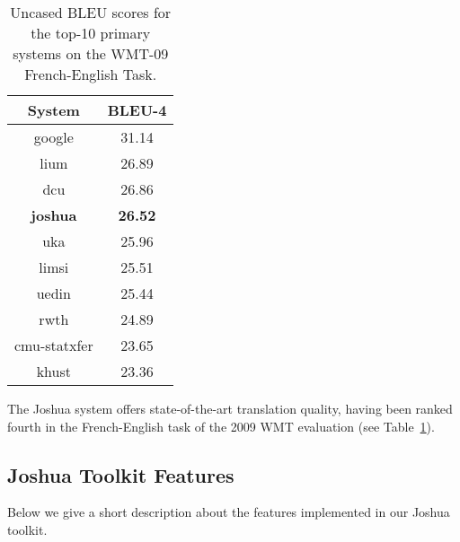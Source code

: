 \documentclass[11pt]{article}
\begin{document}
\newpage

\begin{table}[t]
\begin{center}
\begin{tabular}{c c}\hline
  System & BLEU-4 \\ \hline
  google & 31.14 \\
  lium & 26.89 \\
  dcu & 26.86 \\
  {\bf joshua} & {\bf 26.52} \\ 
  uka & 25.96 \\
  limsi & 25.51 \\
  uedin & 25.44 \\
  rwth & 24.89 \\
  cmu-statxfer & 23.65 \\
  khust & 23.36 \\ \hline
\end{tabular}
\end{center}
\caption{Uncased BLEU scores for the top-10 primary systems on the WMT-09 French-English Task.}
\label{results-wmt09}
\end{table}

The Joshua system offers state-of-the-art translation quality, having been ranked fourth in the French-English task of the 2009 WMT evaluation (see Table~\ref{results-wmt09}).

\subsection{Joshua Toolkit Features}

Below we give a short description about the features implemented in our Joshua toolkit.
\end{document}
